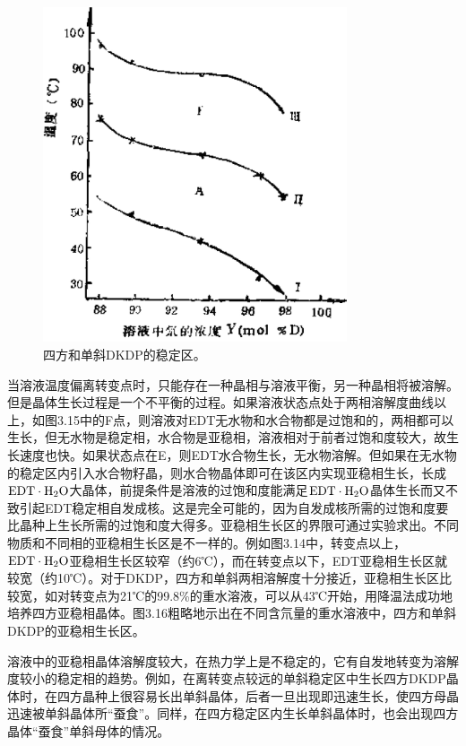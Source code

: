 \begin{figure}[h]
 \centering
 \includegraphics[width=0.8\textwidth]{fig/cp03/img3.16.jpg}
 \caption{四方和单斜DKDP的稳定区。}
\end{figure}

当溶液温度偏离转变点时，只能存在一种晶相与溶液平衡，另一种晶相将被溶解。但是晶体生长过程是一个不平衡的过程。如果溶液状态点处于两相溶解度曲线以上，如图3.15中的F点，则溶液对EDT无水物和水合物都是过饱和的，两相都可以生长，但无水物是稳定相，水合物是亚稳相，溶液相对于前者过饱和度较大，故生长速度也快。如果状态点在E，则EDT水合物生长，无水物溶解。但如果在无水物的稳定区内引入水合物籽晶，则水合物晶体即可在该区内实现亚稳相生长，长成$\rm EDT\cdot H_2O$大晶体，前提条件是溶液的过饱和度能满足$\rm EDT\cdot H_2O$晶体生长而又不致引起EDT稳定相自发成核。这是完全可能的，因为自发成核所需的过饱和度要比晶种上生长所需的过饱和度大得多。亚稳相生长区的界限可通过实验求出。不同物质和不同相的亚稳相生长区是不一样的。例如图3.14中，转变点以上，$\rm EDT\cdot H_2O$亚稳相生长区较窄（约6℃），而在转变点以下，EDT亚稳相生长区就较宽（约10℃）。对于DKDP，四方和单斜两相溶解度十分接近，亚稳相生长区比较宽，如对转变点为21℃的99.8\%的重水溶液，可以从43℃开始，用降温法成功地培养四方亚稳相晶体。图3.16粗略地示出在不同含氘量的重水溶液中，四方和单斜DKDP的亚稳相生长区。

溶液中的亚稳相晶体溶解度较大，在热力学上是不稳定的，它有自发地转变为溶解度较小的稳定相的趋势。例如，在离转变点较远的单斜稳定区中生长四方DKDP晶体时，在四方晶种上很容易长出单斜晶体，后者一旦出现即迅速生长，使四方母晶迅速被单斜晶体所“蚕食”。同样，在四方稳定区内生长单斜晶体时，也会出现四方晶体“蚕食”单斜母体的情况。

